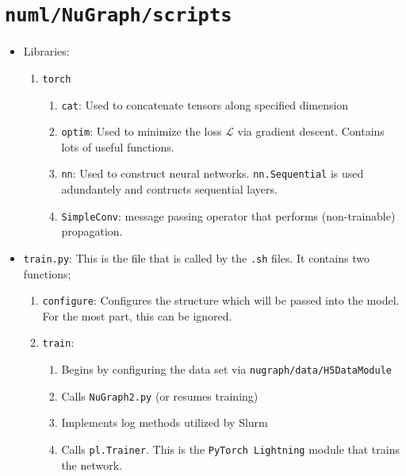 \section{\texttt{numl/NuGraph/scripts}}


    
\begin{itemize}
    \item Libraries:
        \begin{enumerate}
            \item \texttt{torch}
                \begin{enumerate}
                    \item \texttt{cat}: Used to concatenate tensors along specified dimension
                    \item \texttt{optim}: Used to minimize the loss $\mathcal{L}$ via gradient descent. Contains lots of useful functions.
                    \item \texttt{nn}: Used to construct neural networks. \texttt{nn.Sequential} is used adundantely and contructs sequential layers.

                    \item \texttt{SimpleConv}: message passing operator that performs (non-trainable) propagation.
                \end{enumerate}
        \end{enumerate}


    \item \texttt{train.py}: This is the file that is called by the \texttt{.sh} files. It contains two functions;
        \begin{enumerate}
            \item \texttt{configure}: Configures the structure which will be passed into the model. For the most part, this can be ignored. 

            \item \texttt{train}: 
                \begin{enumerate}
                    \item Begins by configuring the data set via \texttt{nugraph/data/H5DataModule}
                    \item Calls \texttt{NuGraph2.py} (or resumes training)
                    \item Implements log methods utilized by Slurm
                    \item Calls \texttt{pl.Trainer}. This is the \texttt{PyTorch Lightning} module that trains the network.
                \end{enumerate}
        \end{enumerate}


\end{itemize}
